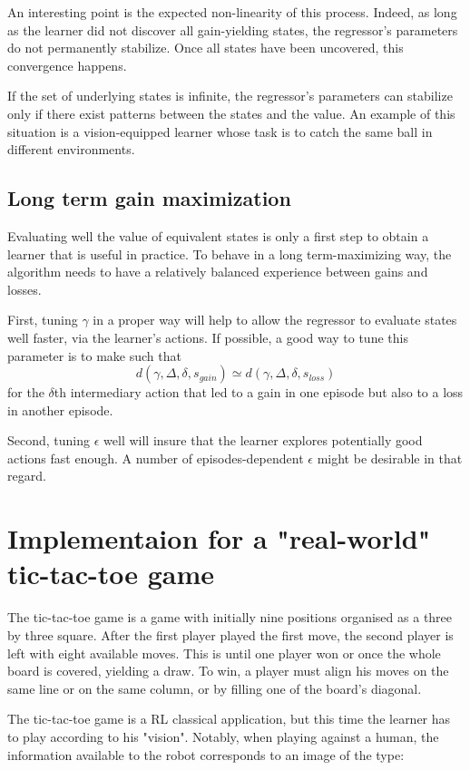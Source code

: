 \documentclass[letterpaper, 10.5 pt, conference]{ieeeconf}
\begin{document}
An interesting point is the expected non-linearity of this process. Indeed, as long as the learner did not discover all gain-yielding states, the regressor's parameters do not permanently stabilize. Once all states have been uncovered, this convergence happens.

If the set of underlying states is infinite, the regressor's parameters can stabilize only if there exist patterns between the states and the value. An example of this situation is a vision-equipped learner whose task is to catch the same ball in different environments.

\subsection{Long term gain maximization}

Evaluating well the value of equivalent states is only a first step to obtain a learner that is useful in practice. To behave in a long term-maximizing way, the algorithm needs to have a relatively balanced experience between gains and losses. 

First, tuning $\gamma$ in a proper way will help to allow the regressor to evaluate states well faster, via the learner's actions. If possible, a good way to tune this parameter is to make such that
$$d(\gamma, \Delta, \delta, s_{gain}) \simeq d(\gamma, \Delta, \delta, s_{loss})$$
for the $\delta$th intermediary action that led to a gain in one episode but also to a loss in another episode.

Second, tuning $\epsilon$ well will insure that the learner explores potentially good actions fast enough. A number of episodes-dependent $\epsilon$ might be desirable in that regard.

\section{Implementaion for a "real-world" tic-tac-toe game}

The tic-tac-toe game is a game with initially nine positions organised as a three by three square. After the first player played the first move, the second player is left with eight available moves. This is until one player won or once the whole board is covered, yielding a draw. To win, a player must align his moves on the same line or on the same column, or by filling one of the board's diagonal.

The tic-tac-toe game is a RL classical application, but this time the learner has to play according to his "vision". Notably, when playing against a human, the information available to the robot corresponds to an image of the type:
\end{document}
